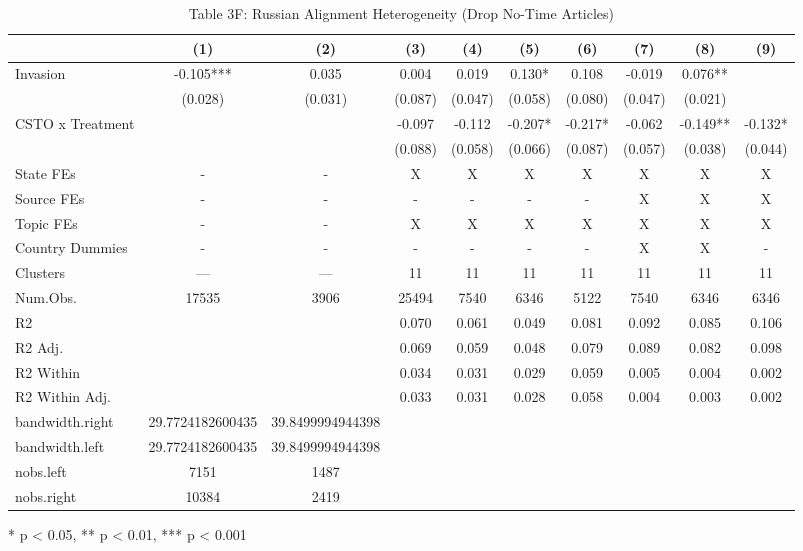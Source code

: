 \begin{table}[!t]
\caption{Table 3F: Russian Alignment Heterogeneity (Drop No-Time Articles)} 
\fontsize{12.0pt}{14.4pt}\selectfont
\begin{tabular*}{\linewidth}{@{\extracolsep{\fill}}lccccccccc}
\toprule
  & (1) & (2) & (3) & (4) & (5) & (6) & (7) & (8) & (9) \\ 
\midrule\addlinespace[2.5pt]
Invasion & -0.105*** & 0.035 & 0.004 & 0.019 & 0.130* & 0.108 & -0.019 & 0.076** &  \\ 
 & (0.028) & (0.031) & (0.087) & (0.047) & (0.058) & (0.080) & (0.047) & (0.021) &  \\ 
CSTO x Treatment &  &  & -0.097 & -0.112 & -0.207* & -0.217* & -0.062 & -0.149** & -0.132* \\ 
{} & {} & {} & {(0.088)} & {(0.058)} & {(0.066)} & {(0.087)} & {(0.057)} & {(0.038)} & {(0.044)} \\ 
State FEs & - & - & X & X & X & X & X & X & X \\ 
Source FEs & - & - & - & - & - & - & X & X & X \\ 
Topic FEs & - & - & X & X & X & X & X & X & X \\ 
Country Dummies & - & - & - & - & - & - & X & X & - \\ 
Clusters & — & — & 11 & 11 & 11 & 11 & 11 & 11 & 11 \\ 
Num.Obs. & 17535 & 3906 & 25494 & 7540 & 6346 & 5122 & 7540 & 6346 & 6346 \\ 
R2 &  &  & 0.070 & 0.061 & 0.049 & 0.081 & 0.092 & 0.085 & 0.106 \\ 
R2 Adj. &  &  & 0.069 & 0.059 & 0.048 & 0.079 & 0.089 & 0.082 & 0.098 \\ 
R2 Within &  &  & 0.034 & 0.031 & 0.029 & 0.059 & 0.005 & 0.004 & 0.002 \\ 
R2 Within Adj. &  &  & 0.033 & 0.031 & 0.028 & 0.058 & 0.004 & 0.003 & 0.002 \\ 
bandwidth.right & 29.7724182600435 & 39.8499994944398 &  &  &  &  &  &  &  \\ 
bandwidth.left & 29.7724182600435 & 39.8499994944398 &  &  &  &  &  &  &  \\ 
nobs.left & 7151 & 1487 &  &  &  &  &  &  &  \\ 
nobs.right & 10384 & 2419 &  &  &  &  &  &  &  \\ 
\bottomrule
\end{tabular*}
\begin{minipage}{\linewidth}
* p < 0.05, ** p < 0.01, *** p < 0.001\\

\end{minipage}
\end{table}
